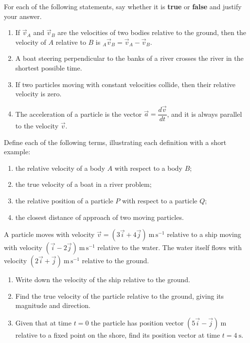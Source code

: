 \documentclass[11pt]{article}
\newcommand{\cle}[1]{{\popxbold\color{popdark}#1}}
\begin{document}
\begin{exercice}
For each of the following statements, say whether it is \textbf{true} or \textbf{false} and justify your answer.
\begin{enumerate}
\item If $\vec{v}_A$ and $\vec{v}_B$ are the velocities of two bodies relative to the ground, then the velocity of $A$ relative to $B$ is ${}_A\vec{v}_B = \vec{v}_A - \vec{v}_B$.
\item A boat steering perpendicular to the banks of a river crosses the river in the shortest possible time.
\item If two particles moving with constant velocities collide, then their relative velocity is zero.
\item The acceleration of a particle is the vector $\vec{a} = \dfrac{d\vec{v}}{dt}$, and it is always parallel to the velocity $\vec{v}$.
\end{enumerate}
\end{exercice}

\begin{exercice}[Definitions]
Define each of the following terms, illustrating each definition with a short example:
\begin{enumerate}
\item the \cle{relative velocity} of a body $A$ with respect to a body $B$;
\item the \cle{true velocity} of a boat in a river problem;
\item the \cle{relative position} of a particle $P$ with respect to a particle $Q$;
\item the \cle{closest distance of approach} of two moving particles.
\end{enumerate}
\end{exercice}

\begin{exercice}
A particle moves with velocity $\vec{v} = (3\vec{i} + 4\vec{j})\ \mathrm{m\,s^{-1}}$ relative to a ship moving with velocity $(\vec{i} - 2\vec{j})\ \mathrm{m\,s^{-1}}$ relative to the water. The water itself flows with velocity $(2\vec{i} + \vec{j})\ \mathrm{m\,s^{-1}}$ relative to the ground.
\begin{enumerate}
\item Write down the velocity of the ship relative to the ground.
\item Find the true velocity of the particle relative to the ground, giving its magnitude and direction.
\item Given that at time $t = 0$ the particle has position vector $(5\vec{i} - \vec{j})\ \mathrm{m}$ relative to a fixed point on the shore, find its position vector at time $t = 4\ \mathrm{s}$.
\end{enumerate}
\end{exercice}
\end{document}
